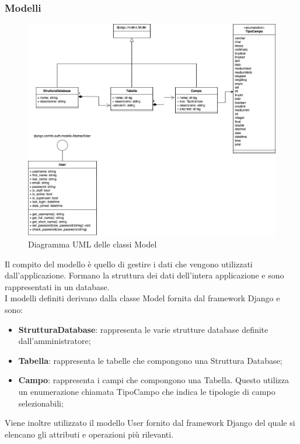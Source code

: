 \documentclass[5pt]{article}
\begin{document}
	\subsubsection{Modelli}
	
	\begin{figure}[H]
		\includegraphics[scale=0.55]{UML_classes/models.png}
		\caption{Diagramma UML delle classi Model}
		\centering
	\end{figure}	
	
	Il compito del modello è quello di gestire i dati che vengono utilizzati dall'applicazione. Formano la struttura dei dati dell'intera applicazione e sono rappresentati in un database.\\
	
	I modelli definiti derivano dalla classe Model fornita dal framework Django e sono:
	\begin{itemize}
		\item \textbf{StrutturaDatabase}: rappresenta le varie strutture database definite dall'amministratore;
		\item \textbf{Tabella}: rappresenta le tabelle che compongono una Struttura Database;
		\item \textbf{Campo}: rappresenta i campi che compongono una Tabella. Questo utilizza un enumerazione chiamata TipoCampo che indica le tipologie di campo selezionabili;
	\end{itemize}
	
	Viene inoltre utilizzato il modello User fornito dal framework Django del quale si elencano gli attributi e operazioni più rilevanti.\\
	
\end{document}

